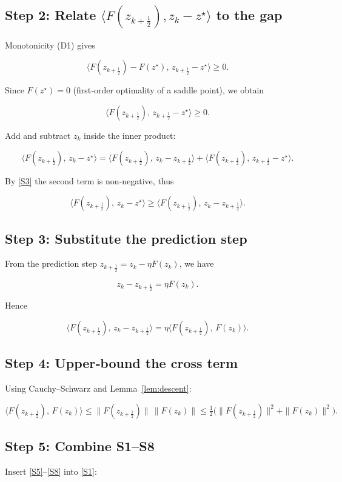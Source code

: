 \documentclass{article}
\begin{document}
\subsection*{Step 2: Relate $\langle F(z_{k+\frac12}),z_k-z^{\star}\rangle$ to the gap}
Monotonicity (D1) gives  

\[
\langle F(z_{k+\frac12})-F(z^{\star}),\,z_{k+\frac12}-z^{\star}\rangle\ge0.
\tag{S2}
\]

Since $F(z^{\star})=0$ (first‑order optimality of a saddle point), we obtain  

\[
\langle F(z_{k+\frac12}),\,z_{k+\frac12}-z^{\star}\rangle\ge0.
\tag{S3}
\]

Add and subtract $z_k$ inside the inner product:

\[
\langle F(z_{k+\frac12}),\,z_k-z^{\star}\rangle
=
\langle F(z_{k+\frac12}),\,z_k-z_{k+\frac12}\rangle
+\langle F(z_{k+\frac12}),\,z_{k+\frac12}-z^{\star}\rangle.
\tag{S4}
\]

By \eqref{S3} the second term is non‑negative, thus

\[
\langle F(z_{k+\frac12}),\,z_k-z^{\star}\rangle
\ge \langle F(z_{k+\frac12}),\,z_k-z_{k+\frac12}\rangle.
\tag{S5}
\]

\subsection*{Step 3: Substitute the prediction step}
From the prediction step $z_{k+\frac12}=z_k-\eta F(z_k)$, we have  

\[
z_k-z_{k+\frac12}= \eta F(z_k).
\tag{S6}
\]

Hence  

\[
\langle F(z_{k+\frac12}),\,z_k-z_{k+\frac12}\rangle
= \eta\langle F(z_{k+\frac12}),\,F(z_k)\rangle.
\tag{S7}
\]

\subsection*{Step 4: Upper‑bound the cross term}
Using Cauchy–Schwarz and Lemma~\ref{lem:descent}:

\[
\langle F(z_{k+\frac12}),\,F(z_k)\rangle
\le \|F(z_{k+\frac12})\|\,\|F(z_k)\|
\le \tfrac12\bigl(\|F(z_{k+\frac12})\|^{2}+\|F(z_k)\|^{2}\bigr).
\tag{S8}
\]

\subsection*{Step 5: Combine S1–S8}
Insert \eqref{S5}–\eqref{S8} into \eqref{S1}:
\end{document}
